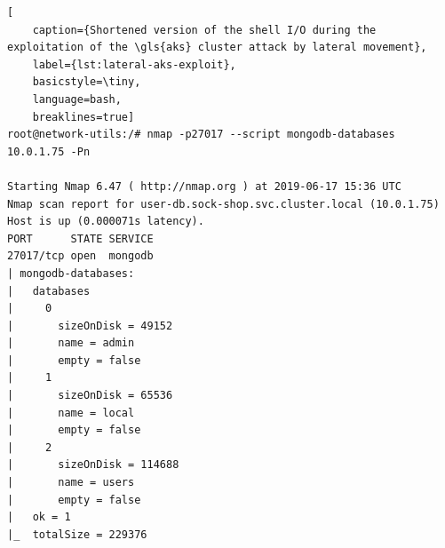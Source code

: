 \begin{lstlisting}[
	caption={Shortened version of the shell I/O during the exploitation of the \gls{aks} cluster attack by lateral movement},
	label={lst:lateral-aks-exploit},
	basicstyle=\tiny,
	language=bash,
	breaklines=true]
root@network-utils:/# nmap -p27017 --script mongodb-databases 10.0.1.75 -Pn

Starting Nmap 6.47 ( http://nmap.org ) at 2019-06-17 15:36 UTC
Nmap scan report for user-db.sock-shop.svc.cluster.local (10.0.1.75)
Host is up (0.000071s latency).
PORT      STATE SERVICE
27017/tcp open  mongodb
| mongodb-databases:
|   databases
|     0
|       sizeOnDisk = 49152
|       name = admin
|       empty = false
|     1
|       sizeOnDisk = 65536
|       name = local
|       empty = false
|     2
|       sizeOnDisk = 114688
|       name = users
|       empty = false
|   ok = 1
|_  totalSize = 229376


\end{lstlisting}
